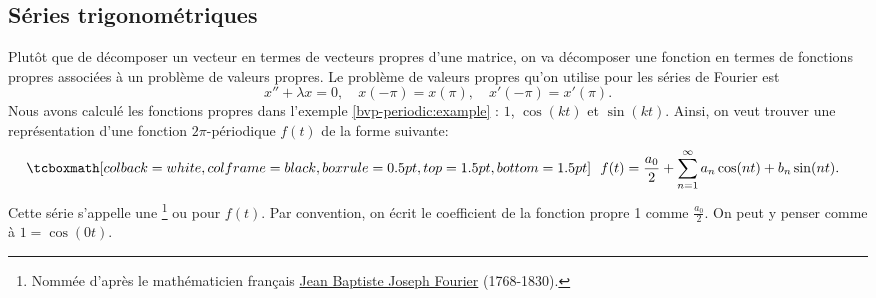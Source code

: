 \subsection{Séries trigonométriques}

Plutôt que de décomposer un vecteur en termes de vecteurs propres d'une matrice, on va décomposer une fonction en termes de fonctions propres associées à un problème de valeurs propres. Le problème de valeurs propres qu'on utilise pour les séries de Fourier est 
\begin{equation*}
x'' + \lambda x = 0, \quad x(-\pi) = x(\pi), \quad x'(-\pi) = x'(\pi) .
\end{equation*}
Nous avons calculé les fonctions propres dans l'exemple \ref{bvp-periodic:example} : $1$, $\cos (k t)$ et
$\sin (k t)$.  Ainsi, on veut trouver une représentation d'une fonction 
$2\pi$-périodique $f(t)$ de la forme suivante: 
\begin{equation*}
\mybxbg{~~
f(t) = \frac{a_0}{2} +
\sum_{n=1}^\infty a_n \cos (n t) + b_n \sin (n t) .
~~}
\end{equation*}
Cette série s'appelle une \emph{}\footnote{%
Nommée d'après le mathématicien français
\href{https://en.wikipedia.org/wiki/Joseph_Fourier}{Jean Baptiste Joseph Fourier}
(1768-1830).} ou
\emph{} pour $f(t)$.
Par convention, on écrit le coefficient de la fonction propre 1 comme $\frac{a_0}{2}$. On peut y penser comme à $1 = \cos (0t)$.


